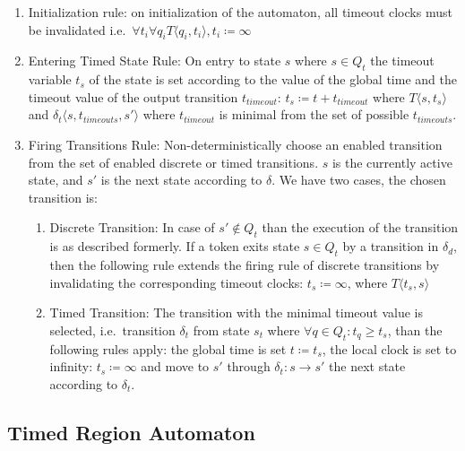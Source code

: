 			\begin{enumerate}
				\item Initialization rule: on initialization of the automaton, all timeout clocks must be invalidated 
				i.e.~$\forall t_i \forall q_i T \langle q_i, t_i \rangle, t_i \coloneqq \infty $
				
				\item Entering Timed State Rule: On entry to state $s$ where $s \in Q_t$ the timeout variable $t_s$ of the state is set according to the value of the global time and the timeout value of the output transition $t_{timeout}$: 
					$t_s\coloneqq t+t_{timeout}$
					where $T\langle s,t_s \rangle$ and $\delta_t\langle s,t_{timeouts},s' \rangle$ where $t_{timeout}$ is minimal from the set of possible $t_{timeouts}$.
				
				\item Firing Transitions Rule: Non-deterministically choose an enabled transition from the set of enabled discrete or timed transitions. 
					$s$ is the currently active state, and $s'$ is the next state according to $\delta$.
					We have two cases, the chosen transition is:
					\begin{enumerate}
						\item Discrete Transition: In case of $s' \notin Q_t$ than the execution of the transition is as described formerly. 
						If a token exits state $s \in Q_t$ by a transition in $\delta_d$, 
						then the following rule extends the firing rule of discrete transitions by invalidating the corresponding timeout clocks:
							$t_s \coloneqq \infty$, where $T \langle t_s, s \rangle$
						\item Timed Transition: The transition with the minimal timeout value is selected, 
							i.e.~transition $\delta_t$ from state $s_t$ where $\forall q \in Q_t: t_q \geq t_s$, than the following rules apply:
							the global time is set $t \coloneqq t_s$, the local clock is set to infinity: 
							$t_s \coloneqq \infty$ and move to $s'$ through $\delta_t : s \rightarrow s'$ the next state according to $\delta_t$.
					\end{enumerate}			
			\end{enumerate}
			
			
		
		\subsection{Timed Region Automaton}
		
